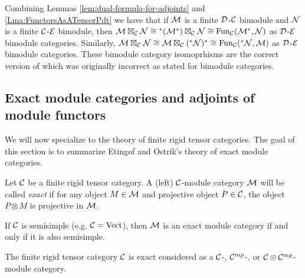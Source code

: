 \documentclass{amsart}
\begin{document}
\begin{remark}
Combining Lemmas \ref{lem:dual-formula-for-adjoints} and \ref{Lma:FunctorsAsATensorPdt} we have that if $\mathcal M$ is a finite $\mathcal D$-$\mathcal C$ bimodule and $\mathcal N$ is a finite $\mathcal C$-$\mathcal E$ bimodule, then $\mathcal M \boxtimes_\mathcal C \mathcal N \cong {}^*(\mathcal M^*) \boxtimes_\mathcal C \mathcal N \cong \operatorname{Fun}_{\mathcal C}(\mathcal M^*,\mathcal N)$ as $\mathcal D$-$\mathcal E$ bimodule categories.   Similarly, $\mathcal M \boxtimes_{\mathcal C} \mathcal N \cong \mathcal M \boxtimes_\mathcal C ({}^*\mathcal N)^* \cong \operatorname{Fun}_{\mathcal C}({}^*\mathcal N,\mathcal M)$ as $\mathcal D$-$\mathcal E$ bimodule categories.  These bimodule category isomoprhisms are the correct version of \cite[Remark 3.6]{0909.3140} which was originally incorrect as stated for bimodule categories.
\end{remark}   







\subsection{Exact module categories and adjoints of module functors}
We will now specialize to the theory of finite rigid tensor categories.  The goal of this section is to summarize Etingof and Ostrik's theory of exact module categories.

\begin{definition}
	Let $\mathcal C$ be a finite rigid tensor category. A (left) $\mathcal C$-module category $\mathcal M$ will be called {\em exact} if for any object $M \in \mathcal M$ and  projective object $P \in \mathcal C$, the object $P \otimes M$ is projective in $\mathcal M$. 
\end{definition}

\begin{example}
	If $\mathcal C$ is semisimple (e.g. $\mathcal C = \mathrm{Vect}$), then $\mathcal M$ is an exact module category if and only if it is also semisimple.
\end{example}

\begin{example}
	The finite rigid tensor category $\mathcal C$ is exact considered as a $\mathcal C$-, $\mathcal C^{mp}$-, or $\mathcal C \otimes \mathcal C^{mp}$-module category. 
\end{example}
\end{document}
